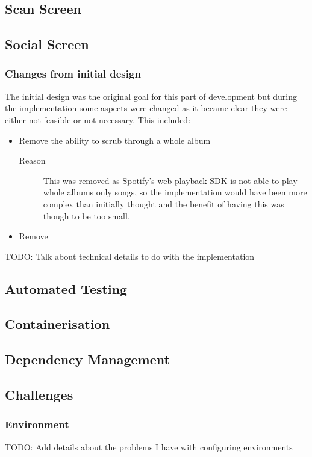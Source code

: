 \subsection{Scan Screen}
\subsection{Social Screen}

\subsubsection{Changes from initial design}
The initial design was the original goal for this part of development but during the implementation some aspects were changed as it became clear they were either not feasible or not necessary. This included:
\begin{itemize}
    \item Remove the ability to scrub through a whole album
    \begin{description}
        \item[Reason] This was removed as Spotify's web playback SDK is not able to play whole albums only songs, so the implementation would have been more complex than initially thought and the benefit of having this was though to be too small.
    \end{description}
    \item Remove
\end{itemize}

TODO: Talk about technical details to do with the implementation
\subsection{Automated Testing}
\subsection{Containerisation}
\subsection{Dependency Management}
\subsection{Challenges}
\subsubsection{Environment}
TODO: Add details about the problems I have with configuring environments

